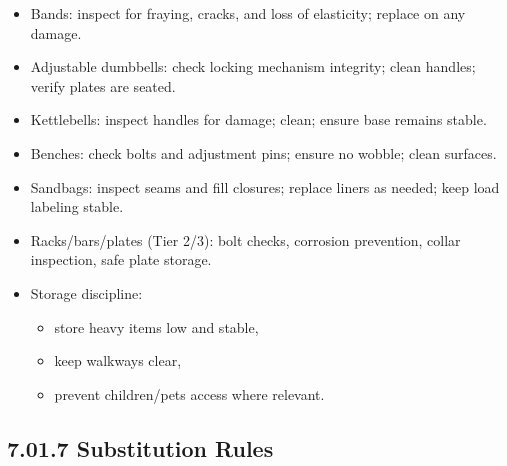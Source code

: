 \documentclass[10pt]{article}
\begin{document}
\begin{itemize}
\item Bands: inspect for fraying, cracks, and loss of elasticity; replace on any damage.
\item Adjustable dumbbells: check locking mechanism integrity; clean handles; verify plates are seated.
\item Kettlebells: inspect handles for damage; clean; ensure base remains stable.
\item Benches: check bolts and adjustment pins; ensure no wobble; clean surfaces.
\item Sandbags: inspect seams and fill closures; replace liners as needed; keep load labeling stable.
\item Racks/bars/plates (Tier 2/3): bolt checks, corrosion prevention, collar inspection, safe plate storage.
\item Storage discipline:
  \begin{itemize}
  \item store heavy items low and stable,
  \item keep walkways clear,
  \item prevent children/pets access where relevant.
  \end{itemize}
\end{itemize}

\subsection*{7.01.7 Substitution Rules}
{}
\end{document}
